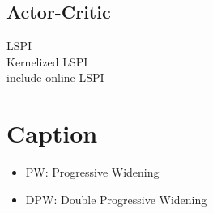 \documentclass[]{article}
\begin{document}
\subsection*{Actor-Critic}
\noindent \cite{lagoudakis2003least} LSPI\\
\noindent \cite{xu2007kernel} Kernelized LSPI\\
\noindent \cite{busoniu2010reinforcement} include online LSPI

\section*{Caption}
\begin{itemize}
\item PW: Progressive Widening
\item DPW: Double Progressive Widening
\end{itemize}


\end{document}
